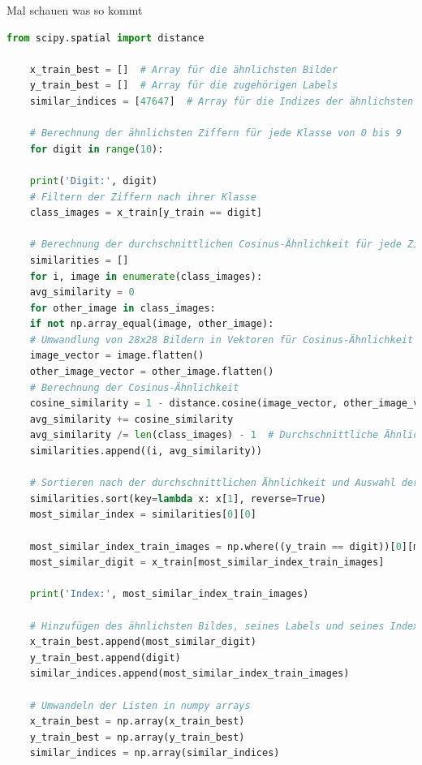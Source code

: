 \documentclass[
fontsize=12pt,					%
paper=a4,						%
twoside=true, 					%
listof=totoc, 					%
bibliography=totoc,				%
titlepage, 						%
headsepline, 					%
DIV=12,							%
BCOR=6mm,						%
cleardoublepage=empty,			%
parskip,							%
ngerman
]{scrartcl}
\begin{document}
Mal schauen was so kommt

\begin{lstlisting}[language=Python, caption=Python-Code, label=python_code]
	from scipy.spatial import distance
	
	x_train_best = []  # Array für die ähnlichsten Bilder
	y_train_best = []  # Array für die zugehörigen Labels
	similar_indices = [47647]  # Array für die Indizes der ähnlichsten Bilder
	
	# Berechnung der ähnlichsten Ziffern für jede Klasse von 0 bis 9
	for digit in range(10):
	
	print('Digit:', digit)
	# Filtern der Ziffern nach ihrer Klasse
	class_images = x_train[y_train == digit]
	
	# Berechnung der durchschnittlichen Cosinus-Ähnlichkeit für jede Ziffer zu anderen Ziffern derselben Klasse
	similarities = []
	for i, image in enumerate(class_images):
	avg_similarity = 0
	for other_image in class_images:
	if not np.array_equal(image, other_image):
	# Umwandlung von 28x28 Bildern in Vektoren für Cosinus-Ähnlichkeit
	image_vector = image.flatten()
	other_image_vector = other_image.flatten()
	# Berechnung der Cosinus-Ähnlichkeit
	cosine_similarity = 1 - distance.cosine(image_vector, other_image_vector)
	avg_similarity += cosine_similarity
	avg_similarity /= len(class_images) - 1  # Durchschnittliche Ähnlichkeit zu allen anderen Ziffern der Klasse außer sich selbst
	similarities.append((i, avg_similarity))
	
	# Sortieren nach der durchschnittlichen Ähnlichkeit und Auswahl der ähnlichsten Ziffer
	similarities.sort(key=lambda x: x[1], reverse=True)
	most_similar_index = similarities[0][0]
	
	most_similar_index_train_images = np.where((y_train == digit))[0][most_similar_index]
	most_similar_digit = x_train[most_similar_index_train_images]
	
	print('Index:', most_similar_index_train_images)
	
	# Hinzufügen des ähnlichsten Bildes, seines Labels und seines Index im train_images Array in den Arrays
	x_train_best.append(most_similar_digit)
	y_train_best.append(digit)
	similar_indices.append(most_similar_index_train_images)
	
	# Umwandeln der Listen in numpy arrays
	x_train_best = np.array(x_train_best)
	y_train_best = np.array(y_train_best)
	similar_indices = np.array(similar_indices)
\end{lstlisting}
\end{document}
